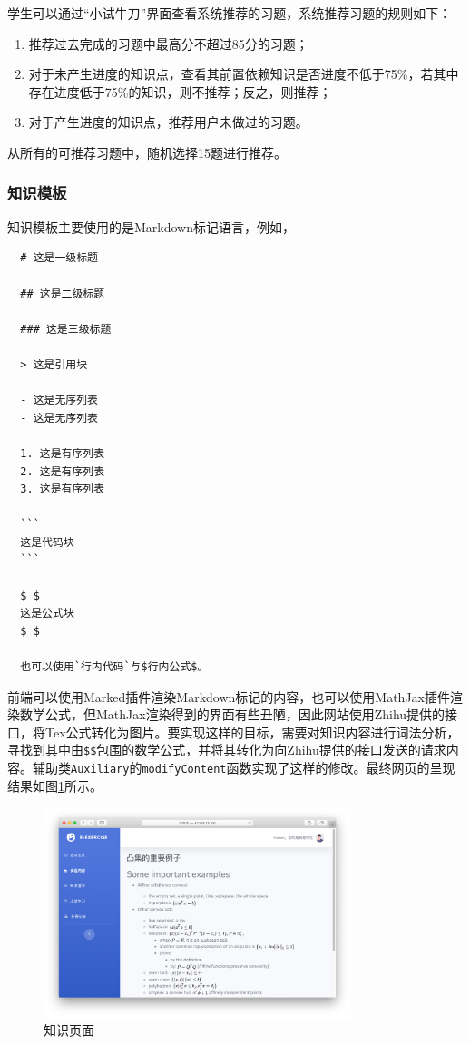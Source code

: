 \documentclass{nwafucoursepaper}
\begin{document}
学生可以通过“小试牛刀”界面查看系统推荐的习题，系统推荐习题的规则如下：
\begin{enumerate}
  \item 推荐过去完成的习题中最高分不超过85分的习题；
  \item 对于未产生进度的知识点，查看其前置依赖知识是否进度不低于75\%，若其中存在进度低于75\%的知识，则不推荐；反之，则推荐；
  \item 对于产生进度的知识点，推荐用户未做过的习题。
\end{enumerate}
从所有的可推荐习题中，随机选择15题进行推荐。

\subsubsection{知识模板}

知识模板主要使用的是Markdown标记语言，例如，
\begin{lstlisting}
  # 这是一级标题

  ## 这是二级标题

  ### 这是三级标题

  > 这是引用块

  - 这是无序列表
  - 这是无序列表

  1. 这是有序列表
  2. 这是有序列表
  3. 这是有序列表

  ```
  这是代码块
  ```

  $ $
  这是公式块
  $ $

  也可以使用`行内代码`与$行内公式$。
\end{lstlisting}

前端可以使用Marked插件渲染Markdown标记的内容，也可以使用MathJax插件渲染数学公式，但MathJax渲染得到的界面有些丑陋，因此网站使用Zhihu提供的接口，将Tex公式转化为图片。要实现这样的目标，需要对知识内容进行词法分析，寻找到其中由\verb|$$|包围的数学公式，并将其转化为向Zhihu提供的接口发送的请求内容。辅助类\verb|Auxiliary|的\verb|modifyContent|函数实现了这样的修改。最终网页的呈现结果如图\ref{knowledge_math}所示。

\begin{figure}[htp]
  \centering
  \includegraphics[width=0.8\textwidth]{knowledge_math.png}
  \caption{知识页面}
  \label{knowledge_math}
\end{figure}
\end{document}
